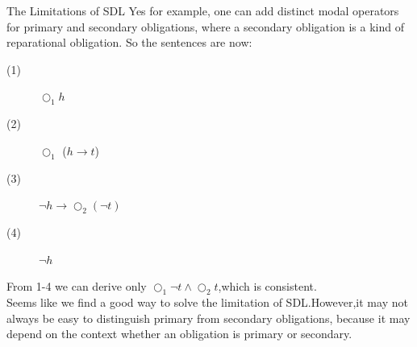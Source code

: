 \documentclass{beamer}
\begin{document}
\begin{frame}{The Limitations of SDL}
Yes for example, one can add distinct modal operators for primary and
secondary  obligations, where a secondary obligation is a kind of reparational obligation.\newline
So the sentences are now:
\begin{description}
\item[(1)] $\bigcirc_{1} h$
\item[(2)]$\bigcirc_{1}$ ($h \to t $)
\item[(3)]$\neg h \to \bigcirc_ {2} (\neg t)$
\item[(4)]$\neg h$
\end{description}
From 1-4 we can derive only $\bigcirc_{1} \neg t \wedge \bigcirc_{2} t$,which is consistent.\\
Seems like we find a good way to solve the limitation of SDL.However,it may not always be easy to distinguish primary from secondary obligations, because it may depend on the context whether an obligation is primary or secondary.
\end{frame}
\end{document}

